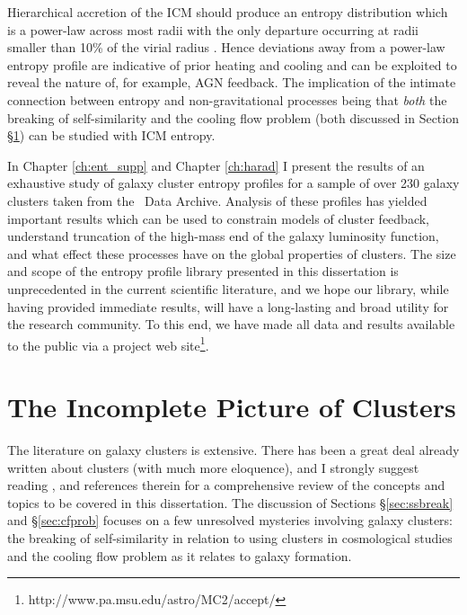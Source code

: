 Hierarchical accretion of the ICM should produce an entropy
distribution which is a power-law across most radii with the only
departure occurring at radii smaller than 10\% of the virial radius
\citep{vkb05}. Hence deviations away from a power-law entropy
profile are indicative of prior heating and cooling and can be
exploited to reveal the nature of, for example, AGN feedback. The
implication of the intimate connection between entropy and
non-gravitational processes being that {\em{both}} the breaking of
self-similarity and the cooling flow problem (both discussed in
Section \S\ref{sec:incomplete}) can be studied with ICM entropy.

In Chapter \ref{ch:ent_supp} and Chapter \ref{ch:harad} I present the
results of an exhaustive study of galaxy cluster entropy profiles for
a sample of over 230 galaxy clusters taken from the \chandra\ Data
Archive. Analysis of these profiles has yielded important results
which can be used to constrain models of cluster feedback, understand
truncation of the high-mass end of the galaxy luminosity function, and
what effect these processes have on the global properties of
clusters. The size and scope of the entropy profile library presented
in this dissertation is unprecedented in the current scientific
literature, and we hope our library, while having provided immediate
results, will have a long-lasting and broad utility for the research
community. To this end, we have made all data and results available to
the public via a project web
site\footnote{http://www.pa.msu.edu/astro/MC2/accept/}.

\section{The Incomplete Picture of Clusters}
\label{sec:incomplete}

The literature on galaxy clusters is extensive. There has been a great
deal already written about clusters (with much more eloquence), and I
strongly suggest reading \citet{1984PhST....7..157M, kaiser86,
1990ApJ...363..349E, kaiser91, sarazinbook, fabiancfreview,
voitreview, cfreview, 2007PhR...443....1M, mcnamrev}, and references
therein for a comprehensive review of the concepts and topics to be
covered in this dissertation. The discussion of Sections
\S\ref{sec:ssbreak} and \S\ref{sec:cfprob} focuses on a few unresolved
mysteries involving galaxy clusters: the breaking of self-similarity
in relation to using clusters in cosmological studies and the cooling
flow problem as it relates to galaxy formation.

